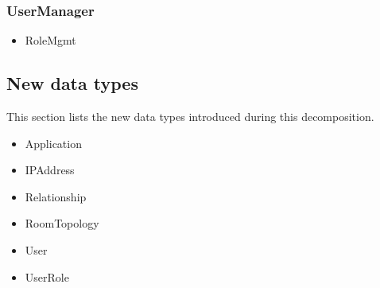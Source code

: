     \subsubsection{UserManager}
        \begin{itemize}
            \item RoleMgmt
        \end{itemize}


\subsection*{New data types}
    This section lists the new data types introduced during this decomposition.

    \begin{itemize}
        \item Application
        \item IPAddress
        \item Relationship
        \item RoomTopology
        \item User
        \item UserRole
    \end{itemize}
